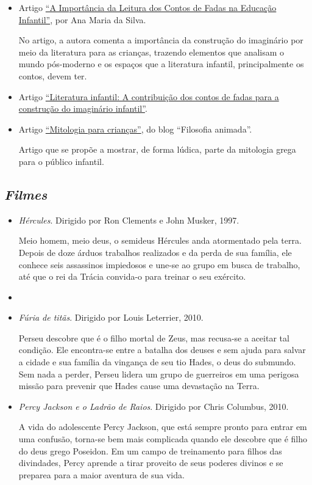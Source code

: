 \documentclass[11pt]{extarticle}
\begin{document}
\begin{itemize}
\item Artigo \href{https://siteantigo.portaleducacao.com.br/conteudo/artigos/educacao/a-importancia-da-leitura-dos-contos-de-fadas-na-educacao-infantil/30151}{``A Importância da Leitura dos Contos de Fadas na Educação Infantil''}, por Ana Maria da Silva.  


No artigo, a autora comenta a importância da construção do imaginário por meio da literatura para as crianças, trazendo elementos que analisam o mundo pós-moderno e os espaços que a literatura infantil, principalmente os contos, devem ter.

\item Artigo \href{http://docs.uninove.br/arte/fac/publicacoes/pdf/v3-n1-2012/Francy.pdf}{``Literatura infantil: A contribuição dos contos de fadas para a construção do imaginário infantil''}.

\item Artigo \href{https://danielmcarlos.wordpress.com/2014/02/09/mitologia-para-criancas/}{``Mitologia para crianças''}, do blog ``Filosofia animada''. 

Artigo que se propõe a mostrar, de forma lúdica, parte da mitologia grega para o público infantil.

\end{itemize}

\subsection{\textit{Filmes}}

\begin{itemize}
\item \textit{Hércules}. Dirigido por Ron Clements e John Musker, 1997.

Meio homem, meio deus, o semideus Hércules anda atormentado pela terra. Depois de doze árduos trabalhos realizados e da perda de sua família, ele conhece seis assassinos impiedosos e une-se ao grupo em busca de trabalho, até que o rei da Trácia convida-o para treinar o seu exército.

\item \item \textit{Fúria de titãs}. Dirigido por Louis Leterrier, 2010.

Perseu descobre que é o filho mortal de Zeus, mas recusa-se a aceitar tal condição. Ele encontra-se entre a batalha dos deuses e sem ajuda para salvar a cidade e sua família da vingança de seu tio Hades, o deus do submundo. Sem nada a perder, Perseu lidera um grupo de guerreiros em uma perigosa missão para prevenir que Hades cause uma devastação na Terra.

\item \textit{Percy Jackson e o Ladrão de Raios}. Dirigido por Chris Columbus, 2010.

A vida do adolescente Percy Jackson, que está sempre pronto para entrar em uma confusão, torna-se bem mais complicada quando ele descobre que é filho do deus grego Poseidon. Em um campo de treinamento para filhos das divindades, Percy aprende a tirar proveito de seus poderes divinos e se preparea para a maior aventura de sua vida.

\end{itemize}
\end{document}
